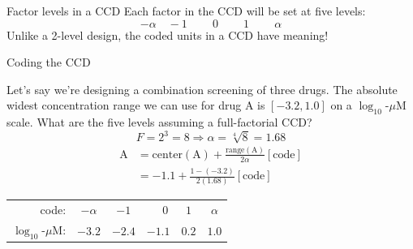\documentclass[10pt]{beamer}
\begin{document}
\begin{frame}{Factor levels in a CCD}
Each factor in the CCD will be set at five levels:
\[ -\alpha\quad-1\quad\phantom{-}0\quad\phantom{-}1\quad\phantom{-}\alpha \]
\pause
Unlike a 2-level design, the coded units in a CCD have meaning!
\end{frame}

\begin{frame}{Coding the CCD}

Let's say we're designing a combination screening of three drugs. The absolute widest concentration range we can use for drug A is $[-3.2, 1.0]$ on a $\log_{10}$-$\mu$M scale. What are the five levels assuming a full-factorial CCD?
\pause
\[ F = 2^3 = 8 \Rightarrow \alpha = \sqrt[4]{8} = 1.68 \]
\pause
\begin{align*}
\text{A} &= \text{center}(\text{A}) + \frac{\text{range}(\text{A})}{2\alpha}[\text{code}] \\
  &= -1.1 + \frac{1 - (-3.2)}{2(1.68)}[\text{code}]
\end{align*}

\pause
\begin{center}
\begin{tabular}{rccccc}
  code: & $-\alpha$ & $-1$ & $\phantom{-}0$ & $1$ & $\alpha$ \\
  $\log_{10}$-$\mu$M: & $-3.2$ & $-2.4$ & $-1.1$ & $0.2$ & $1.0$
\end{tabular}
\end{center}

\end{frame}
\end{document}
